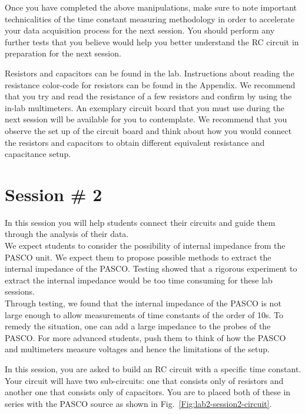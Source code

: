 \documentclass[12pt]{report}
\begin{document}
Once you have completed the above manipulations, make sure to note important technicalities of the time constant measuring methodology in order to accelerate your data acquisition process for the next session. You should perform any further tests that you believe would help you better understand the RC circuit in preparation for the next session.

Resistors and capacitors can be found in the lab. Instructions about reading the resistance color-code for resistors can be found in the Appendix. We recommend that you try and read the resistance of a few resistors and confirm by using the in-lab multimeters. An exemplary circuit board that you must use during the next session will be available for you to contemplate. We recommend that you observe the set up of the circuit board and think about how you would connect the resistors and capacitors to obtain different equivalent resistance and capacitance setup.

\section{Session \# 2}
\begin{tcolorbox}[title=Session \#2]
In this session you will help students connect their circuits and guide them through the analysis of their data.\\

We expect students to consider the possibility of internal impedance from the PASCO unit. We expect them to propose possible methods to extract the internal impedance of the PASCO. Testing showed that a rigorous experiment to extract the internal impedance would be too time consuming for these lab sessions. \\

Through testing, we found that the internal impedance of the PASCO is not large enough to allow measurements of time constants of the order of 10s. To remedy the situation, one can add a large impedance to the probes of the PASCO. For more advanced students, push them to think of how the PASCO and multimeters measure voltages and hence the limitations of the setup.
\end{tcolorbox}

In this session, you are asked to build an RC circuit with a specific time constant. Your circuit will have two sub-circuits: one that consists only of resistors and another one that consists only of capacitors. You are to placed both of these in series with the PASCO source as shown in Fig.~\ref{Fig:lab2-session2-circuit}.
\end{document}
